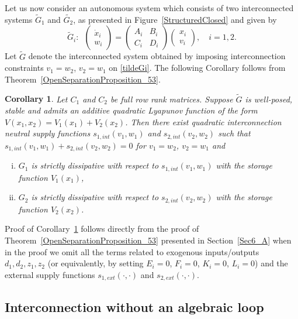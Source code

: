 \documentclass[11pt,a4paper,oneside,DIV=12,headings=small]{scrartcl}
\newtheorem{corollary}[theorem]{Corollary}
\theoremstyle{plain}
\begin{document}
Let us now consider an autonomous system which consists of two interconnected systems $\tilde{G}_1$ and $\tilde{G_2}$, as presented in Figure~\ref{StructuredClosed} and given by
\begin{equation}
\label{tildeGi}
\tilde{G}_i: \,\,\,
\begin{pmatrix} \dot{x}_i \\ w_i  \end{pmatrix}=
\begin{pmatrix} A_i & B_i \\
C_i & D_i \end{pmatrix}
\begin{pmatrix} x_i \\ v_i \end{pmatrix}, 
\quad i=1,2.
\end{equation}
Let $\tilde{G}$ denote the interconnected system obtained by imposing interconnection constraints $v_1=w_2$, $v_2=w_1$ on \eqref{tildeGi}. 
The following Corollary follows from Theorem~\ref{OpenSeparationProposition_53}. 
\begin{corollary}
\label{Cor1}
Let $C_1$ and $C_2$ be full row rank matrices. Suppose $\tilde{G}$ is well-posed, stable and admits an additive quadratic Lyapunov function of the form
$V(x_1,x_2)=V_1(x_1)+V_2(x_2)$. Then there exist quadratic interconnection neutral supply functions $s_{1,int}(v_1,w_1)$ and $s_{2,int}(v_2,w_2)$ such that $s_{1,int}(v_1,w_1) + s_{2,int}(v_2,w_2) =0$ for $v_1=w_2$, $v_2=w_1$ and
\begin{enumerate}[(i)] 
\item $G_1$ is strictly dissipative with respect to $s_{1,int}(v_1,w_1)$ with the storage function $V_1(x_1)$, 
\item $G_2$ is strictly dissipative with respect to $s_{2,int}(v_2,w_2)$ with the storage function $V_2(x_2)$.
\end{enumerate}  
\end{corollary}
Proof of Corollary~\ref{Cor1} follows directly from the proof of Theorem~\ref{OpenSeparationProposition_53} presented in Section~\ref{Sec6_A} when in the proof we omit all the terms related to exogenous inputs/outputs $d_1, d_2, z_1, z_2$ (or equivalently, by setting $E_i=0$, $F_i=0$, $K_i=0$, $L_i=0$) and the external supply functions $s_{1,ext}(\cdot,\cdot)$ and $s_{2,ext}(\cdot,\cdot)$.



\subsection{Interconnection without an algebraic loop}
\label{Sec3_B}
\end{document}

